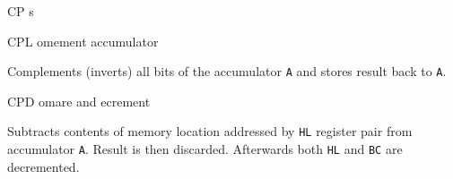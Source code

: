 \begin{basedescript}{
    \desclabelstyle{\multilinelabel}
    \desclabelwidth{3cm}}
\begin{DetailItem}{CP s}
        \begin{DetailEffects}[v]
            \FlagsCPr
        \end{DetailEffects}
		
        \begin{DetailTiming}
        \end{DetailTiming}

    \end{DetailItem}

    \label{DetailRefCPL}
    \begin{DetailItem}{CPL}
        {omement accumulator}
        {\SymCPL}

        Complements (inverts) all bits of the accumulator {\tt A} and stores result back to {\tt A}.

        \begin{DetailEffects}
            \FlagsCPL
        \end{DetailEffects}
		
        \begin{DetailTiming}
        \end{DetailTiming}


    \end{DetailItem}

    \pagebreak
    \begin{DetailItem}{CPD}
        {omare and ecrement}
        {\SymCPD}

        Subtracts contents of memory location addressed by {\tt HL} register pair from accumulator {\tt A}. Result is then discarded. Afterwards both {\tt HL} and {\tt BC} are decremented.

        \begin{DetailEffects}
            \FlagsCPD
        \end{DetailEffects}


\end{DetailItem}
\end{basedescript}

